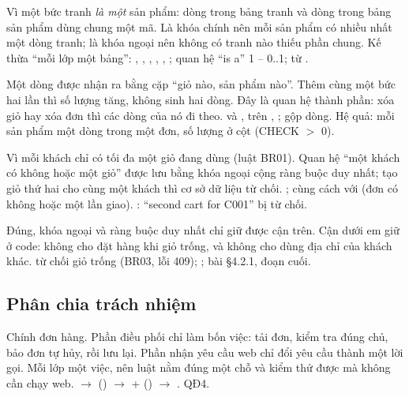 {Vì một bức tranh \emph{là một} sản phẩm: dòng trong bảng tranh và dòng trong bảng sản phẩm dùng chung một mã. Là khóa chính nên mỗi sản phẩm có nhiều nhất một dòng tranh; là khóa ngoại nên không có tranh nào thiếu phần chung.}
{Kế thừa ``mỗi lớp một bảng'': , , , , , ; quan hệ ``is a'' 1 -- 0..1;  từ .}

{Một dòng được nhận ra bằng cặp ``giỏ nào, sản phẩm nào''. Thêm cùng một bức hai lần thì số lượng tăng, không sinh hai dòng. Đây là quan hệ thành phần: xóa giỏ hay xóa đơn thì các dòng của nó đi theo.}
{ và ,  trên , ;  gộp dòng. Hệ quả: mỗi sản phẩm một dòng trong một đơn, số lượng ở cột  (CHECK $>$ 0).}

{Vì mỗi khách chỉ có tối đa một giỏ đang dùng (luật BR01). Quan hệ ``một khách có không hoặc một giỏ'' được lưu bằng khóa ngoại cộng ràng buộc duy nhất; tạo giỏ thứ hai cho cùng một khách thì cơ sở dữ liệu từ chối.}
{ ; cùng cách với  (đơn có không hoặc một lần giao). : ``second cart for C001'' bị từ chối.}

{Đúng, khóa ngoại và ràng buộc duy nhất chỉ giữ được cận trên. Cận dưới em giữ ở code: không cho đặt hàng khi giỏ trống, và không cho dùng địa chỉ của khách khác.}
{ từ chối giỏ trống (BR03, lỗi 409); ; bài §4.2.1, đoạn cuối.}

\subsection{Phân chia trách nhiệm}
{Chính đơn hàng. Phần điều phối chỉ làm bốn việc: tải đơn, kiểm tra đúng chủ, bảo đơn tự hủy, rồi lưu lại. Phần nhận yêu cầu web chỉ đổi yêu cầu thành một lời gọi. Mỗi lớp một việc, nên luật nằm đúng một chỗ và kiểm thử được mà không cần chạy web.}
{ $\to$  (\dongCancelOrder) $\to$  +  (\dongOrderCancel) $\to$ . QĐ4.}

